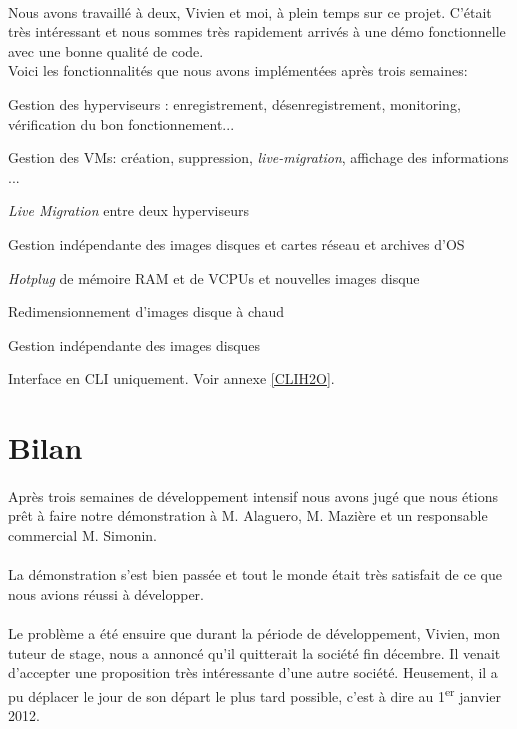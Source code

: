\paragraph*{}
Nous avons travaillé à deux, Vivien et moi, à plein temps sur ce projet. C'était très intéressant et nous sommes très rapidement arrivés à une démo fonctionnelle avec une bonne
qualité de code.
\\
Voici les fonctionnalités que nous avons implémentées après trois semaines:
\begin{listi}
	\item Gestion des hyperviseurs : enregistrement, désenregistrement, monitoring, vérification du bon fonctionnement...
	\item Gestion des VMs: création, suppression, \emph{live-migration}, affichage des informations ...
	\item \emph{Live Migration} entre deux hyperviseurs
	\item Gestion indépendante des images disques et cartes réseau et archives d'OS
	\item \emph{Hotplug} de mémoire RAM et de VCPUs et nouvelles images disque
	\item Redimensionnement d'images disque à chaud
	\item Gestion indépendante des images disques
	\item Interface en CLI uniquement. Voir annexe \ref{CLIH2O}.
\end{listi}

\section{Bilan}

\paragraph*{}
Après trois semaines de développement intensif nous avons jugé que nous étions prêt à faire notre démonstration à M. Alaguero, M. Mazière et un responsable commercial
M. Simonin.

\paragraph*{}
La démonstration s'est bien passée et tout le monde était très satisfait de ce que nous avions réussi à développer.

\paragraph*{}
Le problème a été ensuire que durant la période de développement, Vivien, mon tuteur de stage, nous a annoncé qu'il quitterait la société fin décembre. Il venait d'accepter une proposition très intéressante
d'une autre société. Heusement, il a pu déplacer le jour de son départ le plus tard possible, c'est à dire au 1\textsuperscript{er} janvier 2012.


